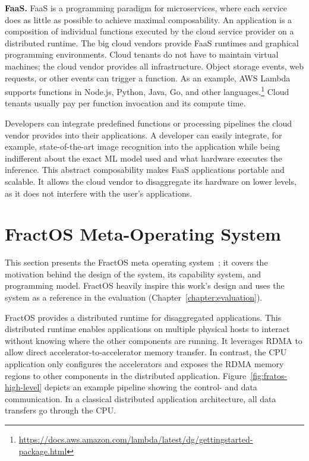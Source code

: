\textbf{\ac{FaaS}.}
\ac{FaaS} is a programming paradigm for microservices, where each service does as little as possible to achieve maximal composability. An application is a composition of individual functions executed by the cloud service provider on a distributed runtime. The big cloud vendors provide \ac{FaaS} runtimes and graphical programming environments.
Cloud tenants do not have to maintain virtual machines; the cloud vendor provides all infrastructure. Object storage events, web requests, or other events can trigger a function. As an example, \ac{AWS} Lambda supports functions in Node.js, Python, Java, Go, and other languages.\footnote{\url{https://docs.aws.amazon.com/lambda/latest/dg/gettingstarted-package.html}} Cloud tenants usually pay per function invocation and its compute time.

Developers can integrate predefined functions or processing pipelines the cloud vendor provides into their applications. A developer can easily integrate, for example, state-of-the-art image recognition into the application while being indifferent about the exact \ac{ML} model used and what hardware executes the inference. This abstract composability makes \ac{FaaS} applications portable and scalable. It allows the cloud vendor to disaggregate its hardware on lower levels, as it does not interfere with the user's applications.

\section{FractOS Meta-Operating System}
This section presents the FractOS meta operating system~\cite{vilanovaSlashingDisaggregationTax2022, vilanovaCaladanDistributedMetaOS}; it covers the motivation behind the design of the system, its capability system, and programming model. FractOS heavily inspire this work's design and uses the system as a reference in the evaluation (Chapter~\ref{chapter:evaluation}).

FractOS provides a distributed runtime for disaggregated applications. This distributed runtime enables applications on multiple physical hosts to interact without knowing where the other components are running. It leverages \ac{RDMA} to allow direct accelerator-to-accelerator memory transfer. In contrast, the \ac{CPU} application only configures the accelerators and exposes the \ac{RDMA} memory regions to other components in the distributed application. Figure~\ref{fig:fratos-high-level} depicts an example pipeline showing the control- and data communication. In a classical distributed application architecture, all data transfers go through the \ac{CPU}.

